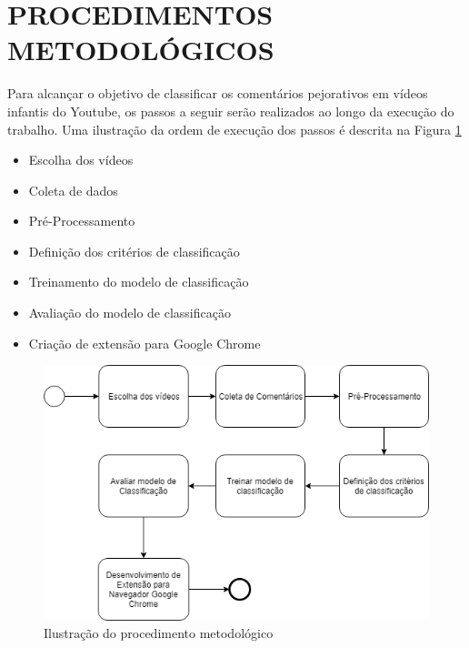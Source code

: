 \section{PROCEDIMENTOS METODOLÓGICOS}

Para alcançar o objetivo de classificar os comentários pejorativos em vídeos infantis do Youtube, os passos a seguir serão realizados ao longo da execução do trabalho.
Uma ilustração da ordem de execução dos passos é descrita na Figura \ref{fig:metodologia}

\begin{itemize}
    \item Escolha dos vídeos
    \item Coleta de dados
    \item Pré-Processamento
    \item Definição dos critérios de classificação
    \item Treinamento do modelo de classificação
    \item Avaliação do modelo de classificação
    \item Criação de extensão para Google Chrome
    
\end{itemize}

\begin{figure}[H] %
	\caption{\label{fig:metodologia} Ilustração do procedimento metodológico}
	\begin{center}
	    \includegraphics[scale=0.7]{figuras/figura_6.png} %
	\end{center}
\end{figure}


